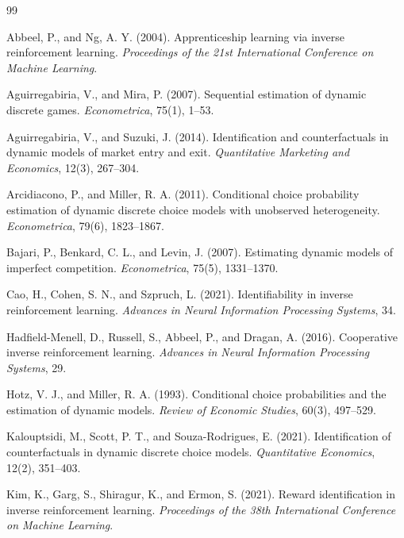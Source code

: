 \documentclass[11pt]{article}
\theoremstyle{definition}
\begin{document}
\begin{thebibliography}{99}

Abbeel, P., and Ng, A. Y. (2004). Apprenticeship learning via inverse reinforcement learning. \emph{Proceedings of the 21st International Conference on Machine Learning}.

Aguirregabiria, V., and Mira, P. (2007). Sequential estimation of dynamic discrete games. \emph{Econometrica}, 75(1), 1--53.

Aguirregabiria, V., and Suzuki, J. (2014). Identification and counterfactuals in dynamic models of market entry and exit. \emph{Quantitative Marketing and Economics}, 12(3), 267--304.

Arcidiacono, P., and Miller, R. A. (2011). Conditional choice probability estimation of dynamic discrete choice models with unobserved heterogeneity. \emph{Econometrica}, 79(6), 1823--1867.

Bajari, P., Benkard, C. L., and Levin, J. (2007). Estimating dynamic models of imperfect competition. \emph{Econometrica}, 75(5), 1331--1370.

Cao, H., Cohen, S. N., and Szpruch, L. (2021). Identifiability in inverse reinforcement learning. \emph{Advances in Neural Information Processing Systems}, 34.

Hadfield-Menell, D., Russell, S., Abbeel, P., and Dragan, A. (2016). Cooperative inverse reinforcement learning. \emph{Advances in Neural Information Processing Systems}, 29.

Hotz, V. J., and Miller, R. A. (1993). Conditional choice probabilities and the estimation of dynamic models. \emph{Review of Economic Studies}, 60(3), 497--529.

Kalouptsidi, M., Scott, P. T., and Souza-Rodrigues, E. (2021). Identification of counterfactuals in dynamic discrete choice models. \emph{Quantitative Economics}, 12(2), 351--403.

Kim, K., Garg, S., Shiragur, K., and Ermon, S. (2021). Reward identification in inverse reinforcement learning. \emph{Proceedings of the 38th International Conference on Machine Learning}.


\end{thebibliography}
\end{document}
